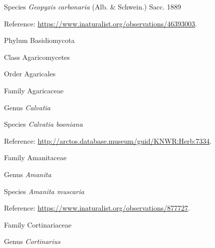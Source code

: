 \documentclass[9pt, article]{memoir}
\begin{document}
\begin{multicols}{2}
\vspace{6pt}\noindent\hspace{36pt}Species \textit{Geopyxis carbonaria} (Alb. \& Schwein.) Sacc. 1889


\vspace{6pt}Reference: 
\url{https://www.inaturalist.org/observations/46393003}.

\vspace{6pt}\noindent\hspace{6pt}Phylum Basidiomycota


\vspace{6pt}\noindent\hspace{12pt}Class Agaricomycetes


\vspace{6pt}\noindent\hspace{18pt}Order Agaricales


\vspace{6pt}\noindent\hspace{24pt}Family Agaricaceae


\vspace{6pt}\noindent\hspace{30pt}Genus \textit{Calvatia}


\vspace{6pt}\noindent\hspace{36pt}Species \textit{Calvatia booniana}


\vspace{6pt}Reference: 
\url{http://arctos.database.museum/guid/KNWR:Herb:7334}.

\vspace{6pt}\noindent\hspace{24pt}Family Amanitaceae


\vspace{6pt}\noindent\hspace{30pt}Genus \textit{Amanita}


\vspace{6pt}\noindent\hspace{36pt}Species \textit{Amanita muscaria}


\vspace{6pt}Reference: 
\url{https://www.inaturalist.org/observations/877727}.

\vspace{6pt}\noindent\hspace{24pt}Family Cortinariaceae


\vspace{6pt}\noindent\hspace{30pt}Genus \textit{Cortinarius}



\end{multicols}
\end{document}

